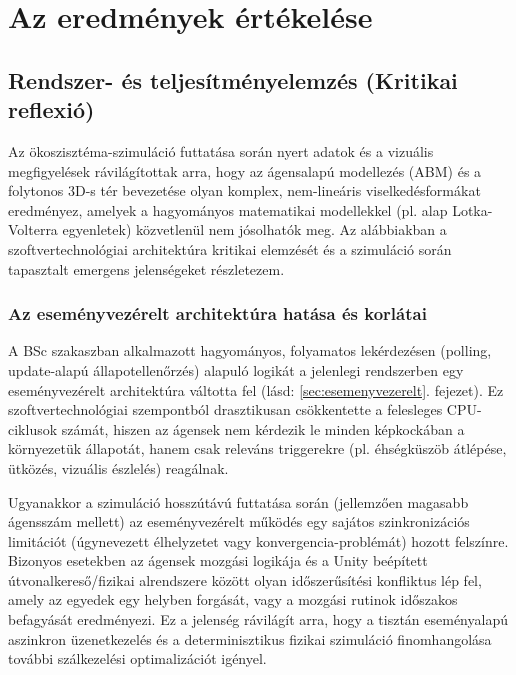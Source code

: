 \chapter{Az eredmények értékelése}
\label{chap:ertekeles}

\section{Rendszer- és teljesítményelemzés (Kritikai reflexió)}

Az ökoszisztéma-szimuláció futtatása során nyert adatok és a vizuális megfigyelések rávilágítottak arra, hogy az ágensalapú modellezés (ABM) és a folytonos 3D-s tér bevezetése olyan komplex, nem-lineáris viselkedésformákat eredményez, amelyek a hagyományos matematikai modellekkel (pl. alap Lotka-Volterra egyenletek) közvetlenül nem jósolhatók meg. Az alábbiakban a szoftvertechnológiai architektúra kritikai elemzését és a szimuláció során tapasztalt emergens jelenségeket részletezem.

\subsection{Az eseményvezérelt architektúra hatása és korlátai}
A BSc szakaszban alkalmazott hagyományos, folyamatos lekérdezésen (polling, update-alapú állapotellenőrzés) alapuló logikát a jelenlegi rendszerben egy eseményvezérelt architektúra váltotta fel (lásd: \ref{sec:esemenyvezerelt}. fejezet). Ez szoftvertechnológiai szempontból drasztikusan csökkentette a felesleges CPU-ciklusok számát, hiszen az ágensek nem kérdezik le minden képkockában a környezetük állapotát, hanem csak releváns triggerekre (pl. éhségküszöb átlépése, ütközés, vizuális észlelés) reagálnak.

Ugyanakkor a szimuláció hosszútávú futtatása során (jellemzően magasabb ágensszám mellett) az eseményvezérelt működés egy sajátos szinkronizációs limitációt (úgynevezett élhelyzetet vagy konvergencia-problémát) hozott felszínre. Bizonyos esetekben az ágensek mozgási logikája és a Unity beépített útvonalkereső/fizikai alrendszere között olyan időszerűsítési konfliktus lép fel, amely az egyedek egy helyben forgását, vagy a mozgási rutinok időszakos befagyását eredményezi. Ez a jelenség rávilágít arra, hogy a tisztán eseményalapú aszinkron üzenetkezelés és a determinisztikus fizikai szimuláció finomhangolása további szálkezelési optimalizációt igényel.

